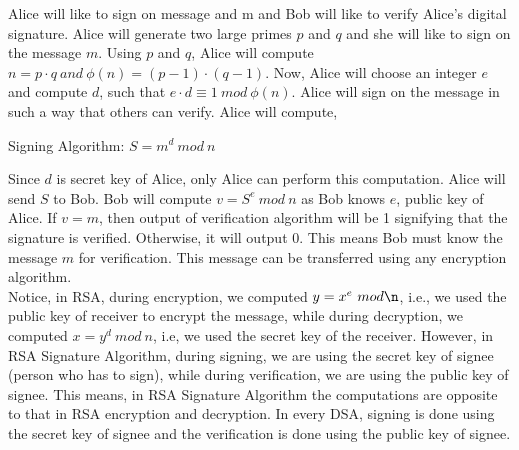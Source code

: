 \documentclass[11pt]{article}
\begin{document}
Alice will like to sign on message and m and Bob will like to verify Alice's digital signature. Alice will generate two large primes $p$ and $q$ and she will like to sign on the message $m$. Using $p$ and $q$, Alice will compute $n = p \cdot q \ and \ \phi(n) = (p-1) \cdot (q-1)$. Now, Alice will choose an integer $e$ and compute $d$, such that $e \cdot d \equiv 1 \ mod \ \phi(n)$. Alice will sign on the message in such a way that others can verify. Alice will compute,
\begin{center}
    Signing Algorithm: $S = m^d \ mod \ n$
\end{center}
Since $d$ is secret key of Alice, only Alice can perform this computation. Alice will send $S$ to Bob. Bob will compute $v = S^e \ mod \ n$ as Bob knows $e$, public key of Alice. If $v = m$, then output of verification algorithm will be 1 signifying that the signature is verified. Otherwise, it will output 0. This means Bob must know the message $m$ for verification. This message can be transferred using any encryption algorithm.\\
\newline
Notice, in RSA, during encryption, we computed $y = x^e \ mod \n$, i.e., we used the public key of receiver to encrypt the message, while during decryption, we computed $x = y^d \ mod \ n$, i.e, we used the secret key of the receiver. However, in RSA Signature Algorithm, during signing, we are using the secret key of signee (person who has to sign), while during verification, we are using the public key of signee. This means, in RSA Signature Algorithm the computations are opposite to that in RSA encryption and decryption. In every DSA, signing is done using the secret key of signee and the verification is done using the public key of signee.\\
\newline
\end{document}

